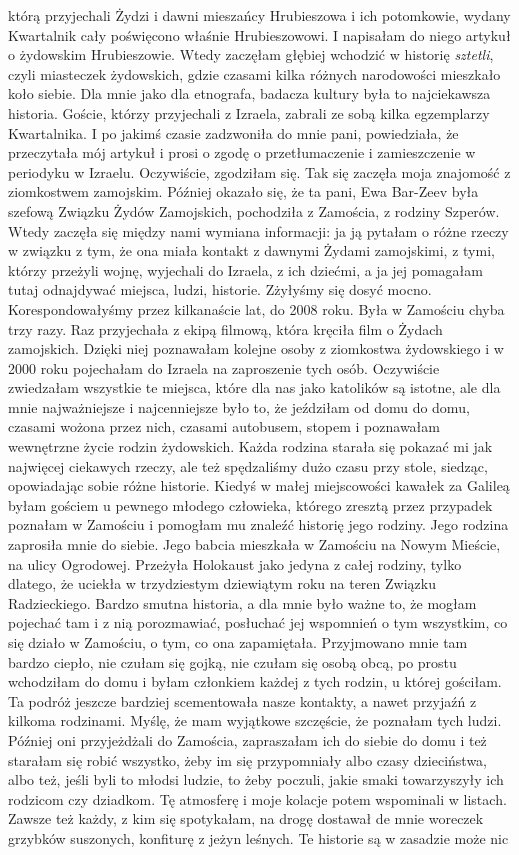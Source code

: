\begin{otherlanguage}{polish}
którą przyjechali Żydzi i dawni mieszańcy Hrubieszowa i ich potomkowie, wydany Kwartalnik cały poświęcono właśnie Hrubieszowowi. I napisałam do niego artykuł o żydowskim Hrubieszowie. Wtedy zaczęłam głębiej wchodzić w historię \textit{sztetli}, czyli miasteczek żydowskich, gdzie czasami kilka różnych narodowości mieszkało koło siebie. Dla mnie jako dla etnografa, badacza kultury była to najciekawsza historia. Goście, którzy przyjechali z Izraela, zabrali ze sobą kilka egzemplarzy Kwartalnika. I po jakimś czasie zadzwoniła do mnie pani, powiedziała, że przeczytała mój artykuł i prosi o zgodę o przetłumaczenie i zamieszczenie w periodyku w Izraelu. Oczywiście, zgodziłam się. Tak się zaczęła moja znajomość z ziomkostwem zamojskim. Później okazało się, że ta pani, Ewa Bar-Zeev była szefową Związku Żydów Zamojskich, pochodziła z Zamościa, z rodziny Szperów. Wtedy zaczęła się między nami  wymiana informacji: ja ją pytałam o różne rzeczy w związku z tym, że ona miała kontakt z dawnymi Żydami zamojskimi, z tymi, którzy przeżyli wojnę, wyjechali do Izraela, z ich dziećmi, a ja jej pomagałam tutaj odnajdywać miejsca, ludzi, historie. Zżyłyśmy się dosyć mocno. Korespondowałyśmy przez kilkanaście lat, do 2008 roku. Była w Zamościu chyba trzy razy. Raz przyjechała z ekipą filmową, która kręciła film o Żydach zamojskich. Dzięki niej poznawałam kolejne osoby z ziomkostwa żydowskiego i w 2000 roku pojechałam do Izraela na zaproszenie tych osób. Oczywiście zwiedzałam wszystkie te miejsca, które dla nas jako katolików są istotne, ale dla mnie najważniejsze i najcenniejsze było to, że jeździłam od domu do domu, czasami wożona przez nich, czasami autobusem, stopem i poznawałam wewnętrzne życie rodzin żydowskich. Każda rodzina starała się pokazać mi jak najwięcej ciekawych rzeczy, ale też spędzaliśmy dużo czasu przy stole, siedząc, opowiadając sobie różne historie. Kiedyś w małej miejscowości kawałek za Galileą byłam gościem u pewnego młodego człowieka, którego zresztą przez przypadek poznałam w Zamościu i pomogłam mu znaleźć historię jego rodziny. Jego rodzina zaprosiła mnie do siebie. Jego babcia mieszkała w Zamościu na Nowym Mieście, na ulicy Ogrodowej. Przeżyła Holokaust jako jedyna z całej rodziny, tylko dlatego, że uciekła w trzydziestym dziewiątym roku na teren Związku Radzieckiego. Bardzo smutna historia, a dla mnie było ważne to, że mogłam pojechać tam i z nią porozmawiać, posłuchać jej wspomnień o tym wszystkim, co się działo w Zamościu, o tym, co ona zapamiętała. Przyjmowano mnie tam bardzo ciepło, nie czułam się gojką, nie czułam się osobą obcą, po prostu wchodziłam do domu i byłam członkiem każdej z tych rodzin, u której gościłam. Ta podróż jeszcze bardziej scementowała nasze kontakty, a nawet przyjaźń z kilkoma rodzinami. Myślę, że mam wyjątkowe szczęście, że poznałam tych ludzi.  Później oni przyjeżdżali do Zamościa, zapraszałam ich do siebie do domu i też starałam się robić wszystko, żeby im się przypomniały albo czasy dzieciństwa, albo też, jeśli byli to młodsi ludzie, to żeby poczuli, jakie smaki towarzyszyły ich rodzicom czy dziadkom. Tę atmosferę i moje kolacje potem wspominali w listach. Zawsze też każdy, z kim się spotykałam, na drogę dostawał de mnie woreczek grzybków suszonych, konfiturę z jeżyn leśnych. Te historie są w zasadzie może nic 
\end{otherlanguage}
